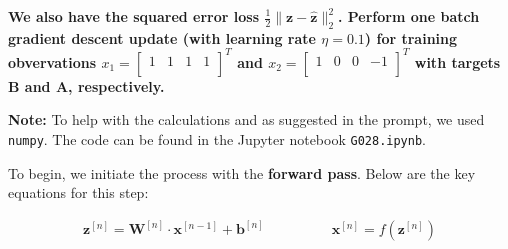 \documentclass[12pt]{article}
\begin{document}
\begin{enumerate}[leftmargin=\labelsep]
          \vskip -0.5cm
          \textbf{We also have the squared error loss $\frac{1}{2} \|\mathbf{z} - \hat{\mathbf{z}}\|^{2}_{2}$. Perform one batch gradient descent update (with learning rate $\eta = 0.1$) for training
          obvervations $x_1 = \begin{bmatrix} 1 & 1 & 1 & 1 \\ \end{bmatrix}^T$ and $x_2 = \begin{bmatrix} 1 & 0 & 0 & -1 \\ \end{bmatrix}^T$ with targets B and A,
          respectively.}

          \vskip 0.3cm
          \textbf{Note:} To help with the calculations and as suggested in the prompt, we used \texttt{numpy}.
          The code can be found in the Jupyter notebook \texttt{G028.ipynb}.

          To begin, we initiate the process with the \textbf{forward pass}. Below are the key equations for this step:

          \begin{align*}
              \mathbf{z}^{[n]} = \mathbf{W}^{[n]} \cdot \mathbf{x}^{[n-1]} + \mathbf{b}^{[n]} & \qquad\qquad
              \mathbf{x}^{[n]} = f\left(\mathbf{z}^{[n]}\right)
          \end{align*}


\end{enumerate}
\end{document}
